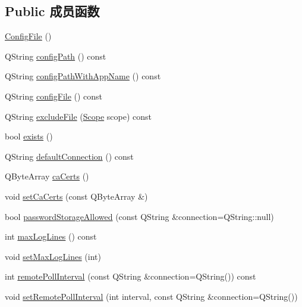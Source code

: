 \subsection*{Public 成员函数}
\begin{DoxyCompactItemize}
\item 
\hyperlink{class_o_c_c_1_1_config_file_aacaf7c5765f599dee90023312f3f60ea}{Config\+File} ()
\item 
Q\+String \hyperlink{class_o_c_c_1_1_config_file_a23a25cd3acabea98021d41cbe71614dc}{config\+Path} () const
\item 
Q\+String \hyperlink{class_o_c_c_1_1_config_file_af8df64f46d6b49040e27c43eee4659f6}{config\+Path\+With\+App\+Name} () const
\item 
Q\+String \hyperlink{class_o_c_c_1_1_config_file_aa3ef945d9e167b852570576593730fcc}{config\+File} () const
\item 
Q\+String \hyperlink{class_o_c_c_1_1_config_file_a01f021637a0819006fb8a10245bd1b0c}{exclude\+File} (\hyperlink{class_o_c_c_1_1_config_file_ab571084ce59ba92b0ce4079460b7c869}{Scope} scope) const
\item 
bool \hyperlink{class_o_c_c_1_1_config_file_ae019a54ab94ac86ec5fcba3f64fc13d9}{exists} ()
\item 
Q\+String \hyperlink{class_o_c_c_1_1_config_file_a7e76c0a3faff2b37e3eea63ebb6efb57}{default\+Connection} () const
\item 
Q\+Byte\+Array \hyperlink{class_o_c_c_1_1_config_file_a460fe71a801d90b23212aa611fd1fb92}{ca\+Certs} ()
\item 
void \hyperlink{class_o_c_c_1_1_config_file_ab36ea9d3137bb883215a6121c113f8b8}{set\+Ca\+Certs} (const Q\+Byte\+Array \&)
\item 
bool \hyperlink{class_o_c_c_1_1_config_file_a11bcbbd4a7817ed1a5a64b3407c4f41b}{password\+Storage\+Allowed} (const Q\+String \&connection=Q\+String\+::null)
\item 
int \hyperlink{class_o_c_c_1_1_config_file_ab4b56c7489cba88f67c4e71561622195}{max\+Log\+Lines} () const
\item 
void \hyperlink{class_o_c_c_1_1_config_file_acc10e077dd13c033795e68da8c8e833d}{set\+Max\+Log\+Lines} (int)
\item 
int \hyperlink{class_o_c_c_1_1_config_file_a10e0a6dc0b064464d4286e760e57debb}{remote\+Poll\+Interval} (const Q\+String \&connection=Q\+String()) const
\item 
void \hyperlink{class_o_c_c_1_1_config_file_a418dbb27d41fb2c3c9c920f429ea5b57}{set\+Remote\+Poll\+Interval} (int interval, const Q\+String \&connection=Q\+String())

\end{DoxyCompactItemize}
